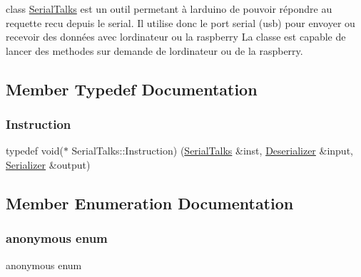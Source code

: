 class \hyperlink{class_serial_talks}{Serial\+Talks} est un outil permetant à l\textquotesingle{}arduino de pouvoir répondre au requette recu depuis le serial. Il utilise donc le port serial (usb) pour envoyer ou recevoir des données avec l\textquotesingle{}ordinateur ou la raspberry La classe est capable de lancer des methodes sur demande de l\textquotesingle{}ordinateur ou de la raspberry. 

\subsection{Member Typedef Documentation}
\mbox{\label{class_serial_talks_a35ccf86c63ad45fb719e81b0c8db2f13}} 
\subsubsection{\texorpdfstring{Instruction}{Instruction}}
{\footnotesize\ttfamily typedef void($\ast$ Serial\+Talks\+::\+Instruction) (\hyperlink{class_serial_talks}{Serial\+Talks} \&inst, \hyperlink{struct_deserializer}{Deserializer} \&input, \hyperlink{struct_serializer}{Serializer} \&output)}



\subsection{Member Enumeration Documentation}
\mbox{\label{class_serial_talks_aa0ccaa2c5993aa8989e592eee55de2b2}} 
\subsubsection{\texorpdfstring{anonymous enum}{anonymous enum}}
{\footnotesize\ttfamily anonymous enum\hspace{0.3cm}{\ttfamily [protected]}}

